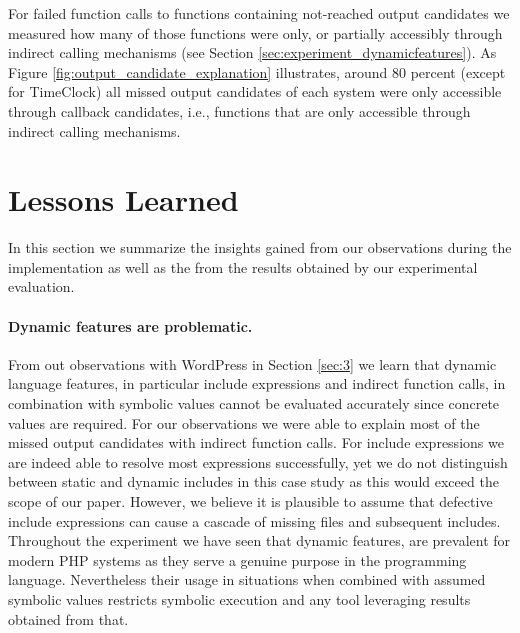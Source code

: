 \documentclass[sigconf]{acmart}
\renewcommand{\sf}[1]{\textsf{#1}}
\begin{document}
For failed function calls to functions containing not-reached output
candidates we measured how many of those functions were only, or
partially accessibly through indirect calling mechanisms (see Section
\ref{sec:experiment_dynamicfeatures}). As Figure
\ref{fig:output_candidate_explanation} illustrates, around 80 percent (except
for \sf{TimeClock}) all missed output candidates of each system were only
accessible through callback candidates, i.e., functions that are only
accessible through indirect calling mechanisms.

\section{Lessons Learned}
In this section we summarize the insights gained from our observations during
the implementation as well as the from the results obtained by our experimental
evaluation.

\paragraph{Dynamic features are problematic.}
From out observations with \sf{WordPress} in Section \ref{sec:3} we learn that
dynamic language features, in particular include expressions and indirect function
calls, in combination with symbolic values cannot be evaluated accurately since
concrete values are required. For our observations we were able to explain most
of the missed output candidates with indirect function calls. For include
expressions we are indeed able to resolve most expressions successfully, yet we
do not distinguish between static and dynamic includes in this case study as
this would exceed the scope of our paper. However, we believe it is plausible
to assume that defective include expressions can cause a cascade of missing
files and subsequent includes.
Throughout the experiment we have seen that dynamic features, are prevalent for
modern PHP systems as they serve a genuine purpose in the programming language.
Nevertheless their usage in situations when combined with assumed symbolic
values restricts symbolic execution and any tool leveraging results obtained
from that.
\end{document}
